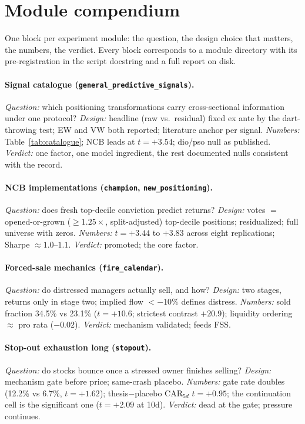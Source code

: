\section{Module compendium}
\label{app:compendium}

One block per experiment module: the question, the design choice that
matters, the numbers, the verdict. Every block corresponds to a
module directory with its pre-registration in the script docstring
and a full report on disk.

\paragraph{Signal catalogue (\texttt{general\_predictive\_signals}).}
\emph{Question:} which positioning transformations carry
cross-sectional information under one protocol? \emph{Design:}
headline (raw vs.\ residual) fixed ex ante by the dart-throwing test;
EW and VW both reported; literature anchor per signal.
\emph{Numbers:} Table~\ref{tab:catalogue}; NCB leads at $t=+3.54$;
dio/pso null as published. \emph{Verdict:} one factor, one model
ingredient, the rest documented nulls consistent with the record.

\paragraph{NCB implementations (\texttt{champion},
\texttt{new\_positioning}).}
\emph{Question:} does fresh top-decile conviction predict returns?
\emph{Design:} votes $=$ opened-or-grown ($\ge1.25\times$,
split-adjusted) top-decile positions; residualized; full universe
with zeros. \emph{Numbers:} $t=+3.44$ to $+3.83$ across eight
replications; Sharpe $\approx 1.0$--$1.1$. \emph{Verdict:} promoted;
the core factor.

\paragraph{Forced-sale mechanics (\texttt{fire\_calendar}).}
\emph{Question:} do distressed managers actually sell, and how?
\emph{Design:} two stages, returns only in stage two; implied flow
$<-10\%$ defines distress. \emph{Numbers:} sold fraction 34.5\% vs
23.1\% ($t=+10.6$; strictest contrast $+20.9$); liquidity ordering
$\approx$ pro rata ($-0.02$). \emph{Verdict:} mechanism validated;
feeds FSS.

\paragraph{Stop-out exhaustion long (\texttt{stopout}).}
\emph{Question:} do stocks bounce once a stressed owner finishes
selling? \emph{Design:} mechanism gate before price; same-crash
placebo. \emph{Numbers:} gate rate doubles (12.2\% vs 6.7\%,
$t=+1.62$); thesis$-$placebo CAR$_{5d}$ $t=+0.95$; the continuation
cell is the significant one ($t=+2.09$ at 10d). \emph{Verdict:} dead
at the gate; pressure continues.

